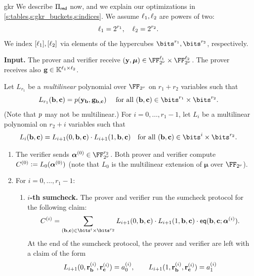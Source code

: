 \begin{lncsappendix}{gkr}
We  describe $\Pi_{\mathsf{red}}$ now, and we explain our optimizations in \cref{s:tables,s:gkr_buckets,s:indices}. We assume $\ell_1,\ell_2$ are powers of two:
%
$$
\ell_1 = 2^{r_1}, \quad \ell_2 = 2^{r_2}.
$$
We index $[\ell_1],[\ell_2]$ via elements of the hypercubes $\bits^{r_1}, \bits^{r_2}$, respectively.
%
\begin{construction}\label{c:gkr_grand_product}
\noindent \textbf{Input.}   The prover and verifier receive $(\yy,\bm{\mu})\in \comfield^{\codedim_1} \times  \comfield^{\codedim_2}$. The prover receives also $\mathbf{g}\in \mathbb{K}^{\ell_1\times \ell_2}$.


Let $L_{r_1}$ be a  \emph{multilinear} polynomial over $\comfield$ on $r_1 + r_2$ variables such that $$L_{r_1}(\bb,\cc)= \gkrpol(\yy_{\bb}, \bfg_{\bb,\cc}) \quad  \text{ for all } (\bb,\cc) \in \bits^{r_1} \times \bits^{r_2}.$$ (Note that $p$ may not be multilinear.)  
     For $i=0,\ldots, r_1-1$, let $L_i$ be a multilinear polynomial on $r_2 + i$ variables  such that 
      $$
  L_{i}(\bb,\cc)  =  L_{i+1}(0,\bb,\cc) \cdot L_{i+1}(1,\bb, \cc)  \quad \text{for all } (\bb,\cc)\in \bits^{i} \times \bits^{r_2}.
    $$
\begin{enumerate}[leftmargin=*]
    \item The verifier sends $\bm{\alpha}^{(0)}\in \comfield^{r_2}$. Both prover and verifier compute $C^{(0)}{\;\vcentcolon=\;} 
    L_0(\bm{\alpha}^{(0)})$ (note that $L_0$ is the multilinear extension of $\bm{\mu}$ over $\comfield$). 
    \item  For $i=0,\ldots, r_1-1$:
    \begin{enumerate}[leftmargin=*]
        \item \textbf{$i$-th sumcheck.} The prover and verifier run the sumcheck protocol for the following claim: %
    $$
    C^{(i)} =  \sum_{(\bb,\cc)\in \bits^i \times \bits^{r_2}}  L_{i+1}(0,\bb,\cc) \cdot L_{i+1}(1,\bb,\cc) \cdot \eq(\bb, \cc; \bm{\alpha}^{(i)}). 
    $$
    At the end of the sumcheck protocol, the prover and verifier are left with a claim of the form
    \begin{equation}\label{e:gkr_intermediate}
    L_{i+1}(0,\mathbf{r}_{\mathbf{b}}^{(i)},\mathbf{r}_{\mathbf{c}}^{(i)}) = a_{0}^{(i)}, \qquad L_{i+1}(1,\mathbf{r}_{\mathbf{b}}^{(i)},\mathbf{r}_{\mathbf{c}}^{(i)}) = a_{1}^{(i)}
    \end{equation}

\end{enumerate}
\end{enumerate}
\end{construction}
\end{lncsappendix}
